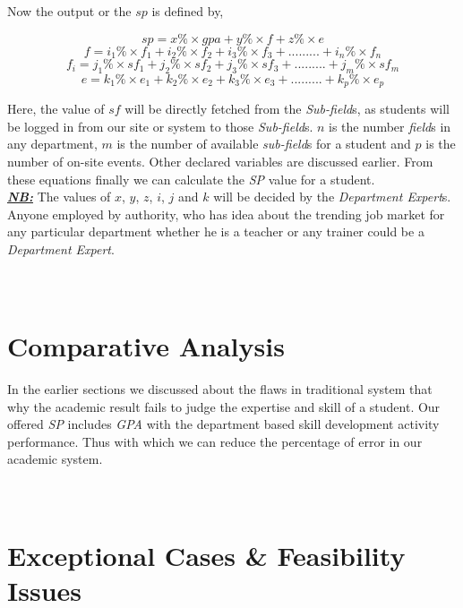 \documentclass[conference]{IEEEtran}
\begin{document}
Now the output or the $sp$ is defined by,

$$sp= x\% \times gpa + y\% \times f + z\% \times e$$
$$f= i_{1}\%\times f_{1}+ i_{2}\%\times f_{2}+i_{3}\%\times f_{3}+... ... ...+i_{n}\%\times f_{n}$$
$$f_{i}= j_{1}\%\times sf_{1}+j_{2}\%\times sf_{2}+j_{3}\%\times sf_{3}+... ... ...+j_{m}\%\times sf_{m}$$
$$e= k_{1}\%\times e_{1}+k_{2}\%\times e_{2}+k_{3}\%\times e_{3}+... ... ...+k_{p}\%\times e_{p}$$

Here, the value of $sf$ will be directly fetched from the \textit{Sub-field}s, as students will be logged in from our site or system to those \textit{Sub-field}s. $n$ is the number \textit{field}s in any department, $m$ is the number of available \textit{sub-field}s for a student and $p$ is the number of on-site events. Other declared variables are discussed earlier. From these equations finally we can calculate the \textit{SP} value for a student. \\

\textbf{\textit{\underline{NB:}}} The values of $x$, $y$, $z$, $i$, $j$ and $k$ will be decided by the \textit{Department Expert}s. Anyone employed by authority, who has idea about the trending job market for any particular department whether he is a teacher or any trainer could be a \textit{Department Expert}.\\\\\\

\section{Comparative Analysis}
In the earlier sections we discussed about the flaws in traditional system that why the academic result fails to judge the expertise and skill of a student. Our offered \textit{SP} includes \textit{GPA} with the department based skill development activity performance. Thus with which we can reduce the percentage of error in our academic system.\\\\\\

\section{Exceptional Cases \& Feasibility Issues}
\end{document}
